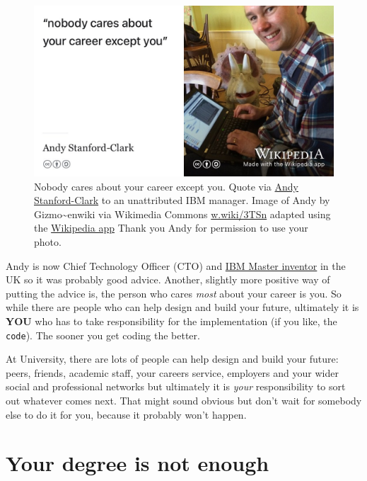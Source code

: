 \documentclass[
]{book}
\begin{document}
\begin{figure}

{\centering \includegraphics[width=0.99\linewidth]{images/nobody-cares-about-your-career-except-you} 

}

\caption{Nobody cares about your career except you. Quote via \href{https://en.wikipedia.org/wiki/Andy_Stanford-Clark}{Andy Stanford-Clark} \citep{andystanfordclark} to an unattributed IBM manager. Image of Andy by Gizmo\textasciitilde enwiki via Wikimedia Commons \href{https://w.wiki/3TSn}{w.wiki/3TSn} adapted using the \href{https://apps.apple.com/us/app/wikipedia/id324715238}{Wikipedia app} Thank you Andy for permission to use your photo.}\label{fig:andysc-fig}
\end{figure}



Andy is now Chief Technology Officer (CTO) and \href{https://en.wikipedia.org/wiki/IBM_Master_Inventor}{IBM Master inventor} in the UK so it was probably good advice. Another, slightly more positive way of putting the advice is, the person who cares \emph{most} about your career is you. So while there are people who can help design and build your future, ultimately it is \textbf{YOU} who has to take responsibility for the implementation (if you like, the \texttt{code}). The sooner you get coding the better.

At University, there are lots of people can help design and build your future: peers, friends, academic staff, your careers service, employers and your wider social and professional networks but ultimately it is \emph{your} responsibility to sort out whatever comes next. That might sound obvious but don't wait for somebody else to do it for you, because it probably won't happen.

\hypertarget{entitled}{%
\section{Your degree is not enough}\label{entitled}}
\end{document}
